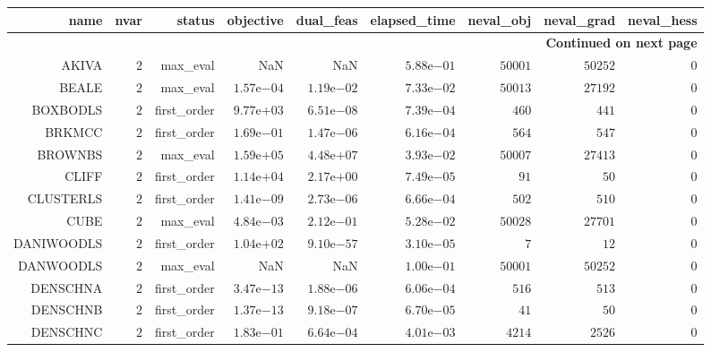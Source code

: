 \begin{longtable}{rrrrrrrrr}
\hline
name & nvar & status & objective & dual\_feas & elapsed\_time & neval\_obj & neval\_grad & neval\_hess \\\hline
\endhead
\hline
\multicolumn{9}{r}{{\bfseries Continued on next page}}\\
\hline
\endfoot
\endlastfoot
AKIVA & \(     2\) & max\_eval &       NaN &       NaN & \( 5.88\)e\(-01\) & \( 50001\) & \( 50252\) & \(     0\) \\
BEALE & \(     2\) & max\_eval & \( 1.57\)e\(-04\) & \( 1.19\)e\(-02\) & \( 7.33\)e\(-02\) & \( 50013\) & \( 27192\) & \(     0\) \\
BOXBODLS & \(     2\) & first\_order & \( 9.77\)e\(+03\) & \( 6.51\)e\(-08\) & \( 7.39\)e\(-04\) & \(   460\) & \(   441\) & \(     0\) \\
BRKMCC & \(     2\) & first\_order & \( 1.69\)e\(-01\) & \( 1.47\)e\(-06\) & \( 6.16\)e\(-04\) & \(   564\) & \(   547\) & \(     0\) \\
BROWNBS & \(     2\) & max\_eval & \( 1.59\)e\(+05\) & \( 4.48\)e\(+07\) & \( 3.93\)e\(-02\) & \( 50007\) & \( 27413\) & \(     0\) \\
CLIFF & \(     2\) & first\_order & \( 1.14\)e\(+04\) & \( 2.17\)e\(+00\) & \( 7.49\)e\(-05\) & \(    91\) & \(    50\) & \(     0\) \\
CLUSTERLS & \(     2\) & first\_order & \( 1.41\)e\(-09\) & \( 2.73\)e\(-06\) & \( 6.66\)e\(-04\) & \(   502\) & \(   510\) & \(     0\) \\
CUBE & \(     2\) & max\_eval & \( 4.84\)e\(-03\) & \( 2.12\)e\(-01\) & \( 5.28\)e\(-02\) & \( 50028\) & \( 27701\) & \(     0\) \\
DANIWOODLS & \(     2\) & first\_order & \( 1.04\)e\(+02\) & \( 9.10\)e\(-57\) & \( 3.10\)e\(-05\) & \(     7\) & \(    12\) & \(     0\) \\
DANWOODLS & \(     2\) & max\_eval &       NaN &       NaN & \( 1.00\)e\(-01\) & \( 50001\) & \( 50252\) & \(     0\) \\
DENSCHNA & \(     2\) & first\_order & \( 3.47\)e\(-13\) & \( 1.88\)e\(-06\) & \( 6.06\)e\(-04\) & \(   516\) & \(   513\) & \(     0\) \\
DENSCHNB & \(     2\) & first\_order & \( 1.37\)e\(-13\) & \( 9.18\)e\(-07\) & \( 6.70\)e\(-05\) & \(    41\) & \(    50\) & \(     0\) \\
DENSCHNC & \(     2\) & first\_order & \( 1.83\)e\(-01\) & \( 6.64\)e\(-04\) & \( 4.01\)e\(-03\) & \(  4214\) & \(  2526\) & \(     0\) \\

\end{longtable}
